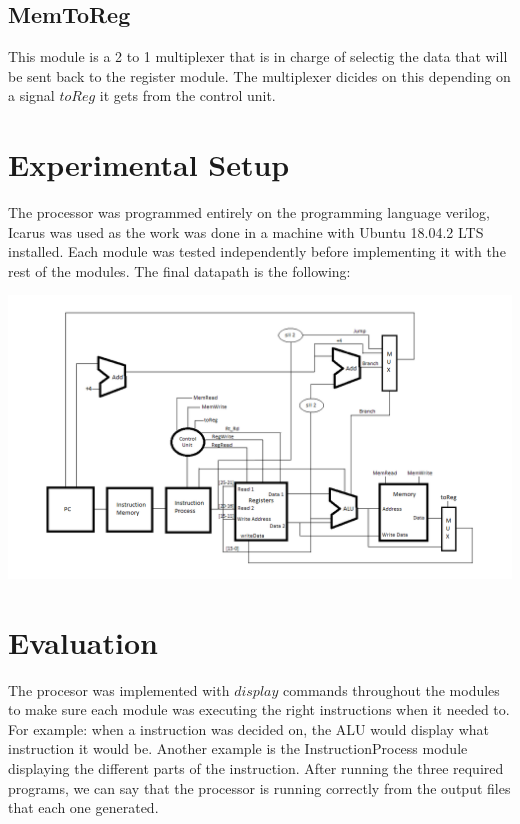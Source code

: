 \documentclass[12pt,a4paper]{article}
\begin{document}
\subsection{MemToReg}
\text This module is a 2 to 1 multiplexer that is in charge of selectig the data that will be sent back to the register module. The multiplexer dicides on this depending on a signal $toReg$ it gets from the control unit.


\section{Experimental Setup}
\text The processor was programmed entirely on the programming language verilog, Icarus was used as the work was done in a machine with Ubuntu 18.04.2 LTS installed. Each module was tested independently before implementing it with the rest of the modules. The final datapath is the following:

\includegraphics[width=14cm]{./datapath.png}

\section{Evaluation}
The procesor was implemented with $display$ commands throughout the modules to make sure each module was executing the right instructions when it needed to. For example: when a instruction was decided on, the ALU would display what instruction it would be. Another example is the InstructionProcess module displaying the different parts of the instruction. After running the three required programs, we can say that the processor is running correctly from the output files that each one generated.
\end{document}
